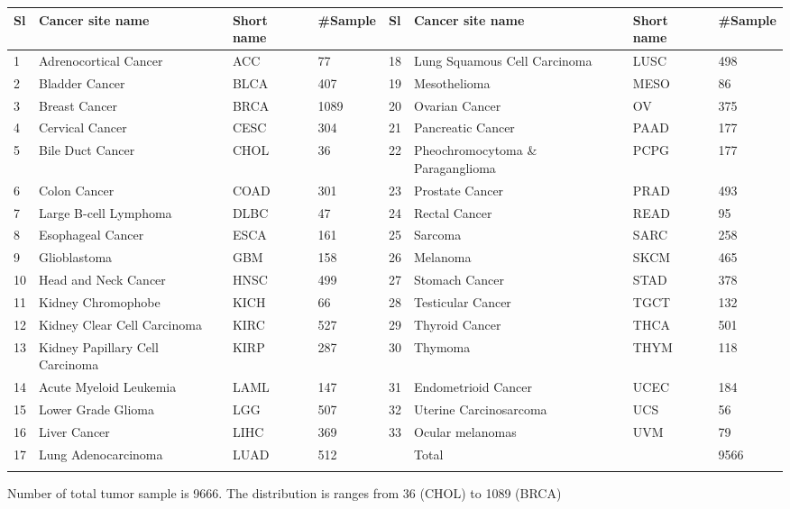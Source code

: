 \documentclass{bioinfo}
\begin{document}
\begin{table}[hbt]
{\begin{tabular}{@{}llll|llll@{}}\toprule Sl	&	Cancer site name	&	Short name	&	\#Sample	&	Sl	&	Cancer site name	&	Short name	&	\#Sample\\\midrule

1	&	Adrenocortical Cancer	&	ACC	&	77	&	18	&	Lung Squamous Cell Carcinoma	&	LUSC	&	498	\\
2	&	Bladder Cancer	&	BLCA	&	407	&	19	&	Mesothelioma	&	MESO	&	86	\\
3	&	Breast Cancer	&	BRCA	&	1089	&	20	&	Ovarian Cancer	&	OV	&	375	\\
4	&	Cervical Cancer	&	CESC	&	304	&	21	&	Pancreatic Cancer	&	PAAD	&	177	\\
5	&	Bile Duct Cancer	&	CHOL	&	36	&	22	&	Pheochromocytoma \& Paraganglioma	&	PCPG	&	177	\\
6	&	Colon Cancer	&	COAD	&	301	&	23	&	Prostate Cancer	&	PRAD	&	493	\\
7	&	Large B-cell Lymphoma	&	DLBC	&	47	&	24	&	Rectal Cancer	&	READ	&	95	\\
8	&	Esophageal Cancer	&	ESCA	&	161	&	25	&	Sarcoma	&	SARC	&	258	\\
9	&	Glioblastoma	&	GBM	&	158	&	26	&	Melanoma	&	SKCM	&	465	\\
10	&	Head and Neck Cancer	&	HNSC	&	499	&	27	&	Stomach Cancer	&	STAD	&	378	\\
11	&	Kidney Chromophobe	&	KICH	&	66	&	28	&	Testicular Cancer	&	TGCT	&	132	\\
12	&	Kidney Clear Cell Carcinoma	&	KIRC	&	527	&	29	&	Thyroid Cancer	&	THCA	&	501	\\
13	&	Kidney Papillary Cell Carcinoma	&	KIRP	&	287	&	30	&	Thymoma	&	THYM	&	118	\\
14	&	Acute Myeloid Leukemia	&	LAML	&	147	&	31	&	Endometrioid Cancer	&	UCEC	&	184	\\
15	&	Lower Grade Glioma	&	LGG	&	507	&	32	&	Uterine Carcinosarcoma	&	UCS	&	56	\\
16	&	Liver Cancer	&	LIHC	&	369	&	33	&	Ocular melanomas	&	UVM	&	79	\\


17	&	Lung Adenocarcinoma	&	LUAD	&	512	&		&	Total	&		& 9566\\\botrule
\end{tabular}}{Number of total tumor sample is 9666. The distribution is ranges from 36 (CHOL) to 1089 (BRCA)}
\end{table}
\end{document}
